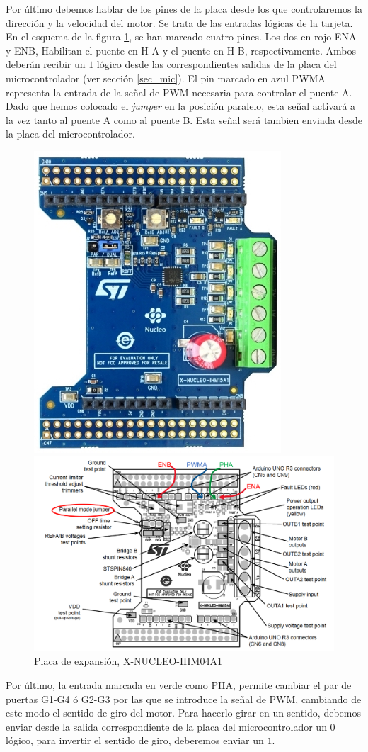 \documentclass[10pt,a4paper]{report}
\begin{document}
Por último debemos hablar de los pines de la placa desde los que controlaremos la dirección y la velocidad del motor. Se trata de las entradas lógicas de la tarjeta.  En el esquema de la figura \ref{f10}, se han marcado cuatro pines. Los dos en rojo ENA y ENB, Habilitan el puente en H A y el puente en H B, respectivamente. Ambos deberán recibir un $1$ lógico desde las correspondientes salidas de la placa del microcontrolador (ver sección \ref{sec_mic}). El pin marcado en azul PWMA representa la entrada de la señal de PWM necesaria para controlar el puente A. Dado que hemos colocado el \emph{jumper} en la posición paralelo, esta señal activará a la vez tanto al puente A como al puente B. Esta señal será tambien enviada desde la placa del microcontrolador. 
\begin{figure}
\centering
\includegraphics[scale=0.65]{IHM15A1.jpg}

\includegraphics[scale=0.55]{IHM15A1E1.png}
\caption{Placa de expansión, X-NUCLEO-IHM04A1}\label{f10}
\end{figure}
Por último, la entrada marcada en verde como PHA, permite cambiar el par de puertas G1-G4 ó G2-G3 por las que se introduce la señal de PWM, cambiando de este modo el sentido de giro del motor. Para hacerlo girar en un sentido, debemos enviar desde la salida correspondiente de la placa del microcontrolador un $0$ lógico, para invertir el sentido de giro, deberemos enviar un $1$.
\end{document}
